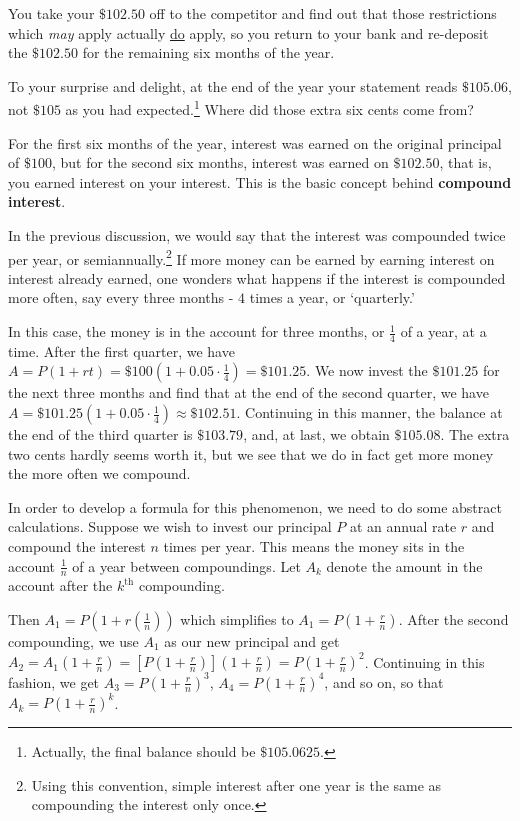 \documentclass{ximera}
\begin{document}
 

You take your $\$102.50$ off to the competitor and find out that those restrictions which \textit{may} apply actually \underline{do} apply, so you return to your bank and re-deposit the $\$102.50$ for the remaining six months of the year. 

  

To your surprise and delight, at the end of the year your statement reads $\$105.06$, not $\$105$ as you had expected.\footnote{Actually, the final balance should be $\$105.0625$.}  Where did those extra six cents come from?  

For the first six months of the year, interest was earned on the original principal of $\$100$, but for the second six months, interest was earned on $\$102.50$, that is, you earned interest on your interest.  This is the basic concept behind \textbf{compound interest}. 

In the previous discussion, we would say that the interest was compounded twice per year, or semiannually.\footnote{Using this convention, simple interest after one year is the same as compounding the interest only once.}  If more money can be earned by earning interest on interest already earned, one wonders what happens if the interest is compounded more often, say every three months -  $4$ times a year, or `quarterly.' 


In this case, the money is in the account for three months, or $\frac{1}{4}$ of a year, at a time.  After the first quarter, we have $A = P(1+rt) =  \$100 \left(1 + 0.05 \cdot \frac{1}{4} \right) = \$101.25$.  We now invest the $\$101.25$ for the next three months and find that at the end of the second quarter, we have $A =  \$101.25 \left(1 + 0.05 \cdot \frac{1}{4} \right)\approx \$102.51$.  Continuing in this manner, the balance at the end of the third quarter is $\$103.79$, and, at last, we obtain $\$105.08$.  The extra two cents hardly seems worth it, but we see that we do in fact get more money the more often we compound. 

In order to develop a formula for this phenomenon, we need to do some abstract calculations.  Suppose we wish to invest our principal $P$ at an annual rate $r$ and compound the interest $n$ times per year.  This means the money sits in the account $\frac{1}{n}$ of a year between compoundings.  Let $A_{k}$ denote the amount in the account after the $k^{\text{th}}$ compounding. 

Then $A_1 = P\left(1 + r\left(\frac{1}{n}\right)\right)$ which simplifies to $A_1 = P \left(1 + \frac{r}{n}\right)$.  After the second compounding, we use $A_1$ as our new principal and get $A_2 = A_1 \left(1 + \frac{r}{n}\right) = \left[P \left(1 + \frac{r}{n}\right)\right]\left(1 + \frac{r}{n}\right) = P \left(1 + \frac{r}{n}\right)^2$.  Continuing in this fashion, we get $A_3 =P \left(1 + \frac{r}{n}\right)^3$, $A_4 =P \left(1 + \frac{r}{n}\right)^4$, and so on, so that $A_{k} = P \left(1 + \frac{r}{n}\right)^k$.  
\end{document}
